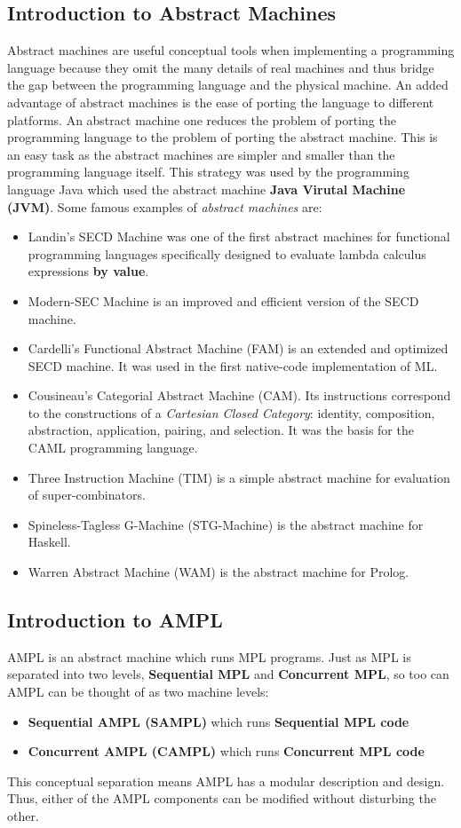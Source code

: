 \documentclass[11pt]{article}
\newcommand{\<}{\langle}
\renewcommand{\>}{\rangle}
\begin{document}
\subsection {Introduction to Abstract Machines}
Abstract machines are useful conceptual tools when implementing a programming language because they omit the many details of real machines and thus bridge the gap between the programming language and the physical machine. An added advantage of abstract machines is the ease of porting the language to different platforms. An abstract machine one reduces the problem of porting the programming language to the problem of porting the abstract machine. This is an easy task as the abstract machines are simpler and smaller than the programming language itself. This strategy was used by the programming language Java which used the abstract machine {\bf Java Virutal Machine (JVM)}. Some famous examples of {\em abstract machines} are:
\begin{itemize} 
  \item Landin's SECD Machine was one of the first abstract machines for functional programming languages specifically designed to evaluate lambda calculus expressions {\bf by value}.
  \item Modern-SEC Machine is an improved and efficient version of the SECD machine.
  \item Cardelli's Functional Abstract Machine (FAM) is an extended and optimized SECD machine. It was used in the first native-code implementation of ML.
  \item Cousineau's Categorial Abstract Machine (CAM). Its instructions correspond to the constructions of a {\em Cartesian Closed Category}: identity, composition, abstraction, application, pairing, and selection. It was the basis for the CAML programming language.
  \item Three Instruction Machine (TIM) is a simple abstract machine for evaluation of super-combinators.
  \item Spineless-Tagless G-Machine (STG-Machine) is the abstract machine for Haskell.
  \item Warren Abstract Machine (WAM) is the abstract machine for Prolog.
\end {itemize}

\subsection {Introduction to AMPL}
AMPL is an abstract machine which runs MPL programs. Just as MPL is separated into two levels, {\bf Sequential MPL} and {\bf Concurrent MPL}, so too can AMPL can be thought of as two machine levels:
\begin{itemize}
  \item {\bf Sequential AMPL (SAMPL)} which runs {\bf Sequential MPL code}
  \item {\bf Concurrent AMPL (CAMPL)} which runs {\bf Concurrent MPL code}
\end {itemize}
This conceptual separation means AMPL has a modular description and design. Thus, either of the AMPL components can be modified without disturbing the other.
\end{document}
